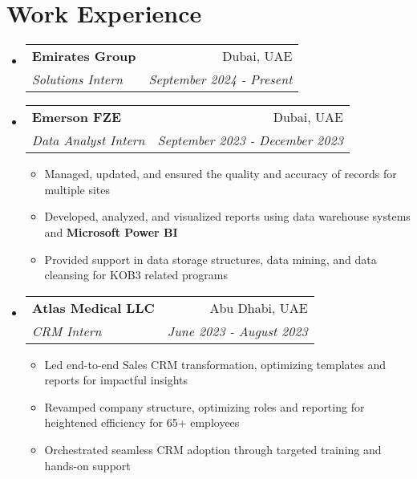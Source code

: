 \documentclass[a4paper,20pt]{article}
\makeatletter
\newcommand{\resumeItemWithoutTitle}[1] {
	\item\small{
		{#1 \vspace{-2pt}}
	}
}
\newcommand{\resumeSubheading}[4] {
	\vspace{-1pt}\item
	\begin{tabular*}{0.97\textwidth}{l@{\extracolsep{\fill}}r}
		\textbf{#1} & #2 \\
		\textit{#3} & \textit{#4} \\
	\end{tabular*}\vspace{-5pt}
}
\newcommand{\resumeSubHeadingListStart}{\begin{itemize}[leftmargin=*]}
\newcommand{\resumeSubHeadingListEnd}{\end{itemize}}
\newcommand{\resumeItemListStart}{\begin{itemize}}
\newcommand{\resumeItemListEnd}{\end{itemize}\vspace{-5pt}}
\makeatother
\begin{document}

\vspace{2pt}

\section{Work Experience}
	\resumeSubHeadingListStart
		\resumeSubheading{Emirates Group}{Dubai, UAE} {Solutions Intern}{September 2024 - Present}
		\vspace{5pt}
		\resumeSubheading{Emerson FZE}{Dubai, UAE} {Data Analyst Intern}{September 2023 - December 2023}
		\resumeItemListStart
			\resumeItemWithoutTitle{Managed, updated, and ensured the quality and accuracy of records for multiple sites}
			\resumeItemWithoutTitle{Developed, analyzed, and visualized reports using data warehouse systems and \textbf{Microsoft Power BI}}
			\resumeItemWithoutTitle{Provided support in data storage structures, data mining, and data cleansing for KOB3 related programs}
		\resumeItemListEnd
		\vspace{5pt}
		\resumeSubheading{Atlas Medical LLC}{Abu Dhabi, UAE} {CRM Intern}{June 2023 - August 2023}
		\resumeItemListStart
			\resumeItemWithoutTitle{Led end-to-end Sales CRM transformation, optimizing templates and reports for impactful insights}
			\resumeItemWithoutTitle{Revamped company structure, optimizing roles and reporting for heightened efficiency for 65+ employees}
			\resumeItemWithoutTitle{Orchestrated seamless CRM adoption through targeted training and hands-on support}
		\resumeItemListEnd
	\resumeSubHeadingListEnd
\vspace{-2pt}
\end{document}
